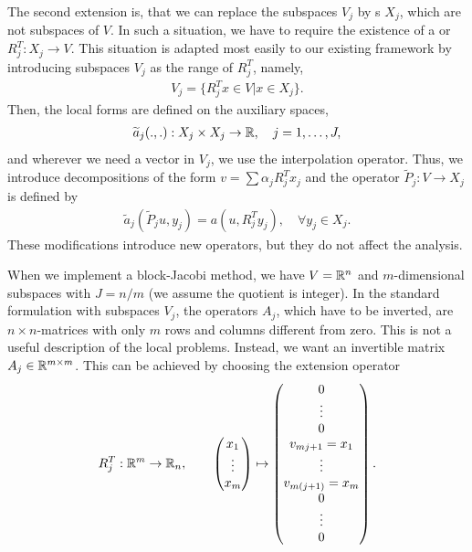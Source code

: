 \begin{remark}
  The second extension is, that we can replace the subspaces $V_j$ by
  s $X_j$, which are not subspaces of
  $V$. In such a situation, we have to require the existence of a
   or  $R_j^T: X_j
  \to V$. This situation is adapted most easily to our existing
  framework by introducing subspaces $V_j$ as the range of $R_j^T$,
  namely,
  \begin{gather}
    \label{eq:schwarz:40}
    V_j = \bigl\{ R_j^T x \in V \big| x\in X_j \bigr\}.
  \end{gather}
  Then, the local forms are defined on the auxiliary spaces,
  \begin{gather}
    \label{eq:schwarz:41}
    \widetilde a_j(.,.) : X_j\times X_j \to \mathbb R, \quad j=1,\dots,J,
  \end{gather}
  and wherever we need a vector in $V_j$, we use the interpolation
  operator. Thus, we introduce decompositions of the form $v = \sum
  \alpha_j R_j^T x_j$ and the operator $\widetilde P_j: V \to X_j$ is
  defined by
  \begin{gather}
    \label{eq:schwarz:43}
    \widetilde a_j(\widetilde P_j u, y_j) = a(u, R_j^T y_j),
    \quad \forall y_j \in X_j.
  \end{gather}
  These modifications introduce new operators, but they do not affect
  the analysis.
\end{remark}

\begin{example}
  When we implement a block-Jacobi method, we have $V = \mathbb R^n$ and
  $m$-dimensional subspaces with $J=n/m$ (we assume the quotient is
  integer). In the standard formulation with subspaces $V_j$, the
  operators $A_j$, which have to be inverted, are $n\times n$-matrices
  with only $m$ rows and columns different from zero. This is not a
  useful description of the local problems. Instead, we want an
  invertible matrix $A_j \in \mathbb R^{m\times m}$. This can be achieved by
  choosing the extension operator
  \begin{gather}
    R_j^T : \mathbb R^m \to \mathbb R_n,
    \qquad
    \begin{pmatrix}
      x_1 \\ \vdots \\ x_m
    \end{pmatrix}
    \mapsto
    \begin{pmatrix}
      0\\ \vdots \\ 0 \\
      v_{mj+1} = x_1 \\ \vdots \\ v_{m(j+1)} = x_m
      \\ 0\\ \vdots \\ 0
    \end{pmatrix}.
  \end{gather}
\end{example}

